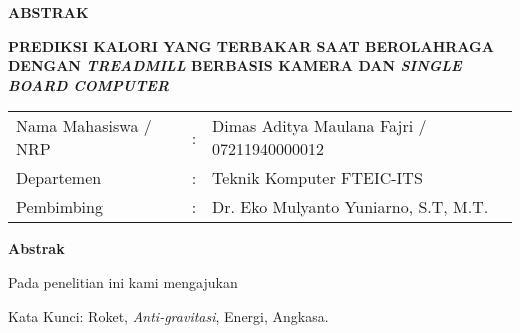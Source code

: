 \begin{center}
  \large\textbf{ABSTRAK}
\end{center}


\vspace{2ex}

\begingroup
  \begin{center}
    \textbf{PREDIKSI KALORI YANG TERBAKAR SAAT BEROLAHRAGA DENGAN \emph{TREADMILL} BERBASIS KAMERA DAN \emph{SINGLE BOARD COMPUTER}}
  \end{center}

  \setlength{\tabcolsep}{0pt}

  \noindent
  \begin{tabularx}{\textwidth}{l >{\centering}m{2em} X}
    Nama Mahasiswa / NRP &:& Dimas Aditya Maulana Fajri / 07211940000012 \\

    Departemen        &:&	Teknik Komputer FTEIC-ITS \\

    Pembimbing        &:& Dr. Eko Mulyanto Yuniarno, S.T, M.T. \\
  \end{tabularx}
\endgroup

\setlength{\tabcolsep}{0pt}
\textbf{Abstrak} 


Pada penelitian ini kami mengajukan \lipsum[1]

Kata Kunci: Roket, \emph{Anti-gravitasi}, Energi, Angkasa.
